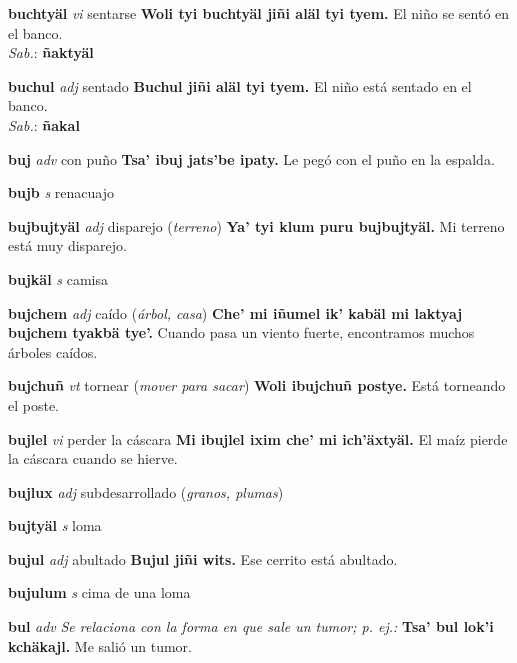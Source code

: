 \documentclass[10pt]{scrbook}
\newcommand{\entry}[1]{\textbf{#1}}
\newcommand{\nontranslationdef}[1]{\textit{#1}}
\newcommand{\partofspeech}[1]{\textit{#1}}
\newcommand{\spanishtranslation}[1]{#1}
\newcommand{\clarification}[1]{(\textit{#1})}
\newcommand{\cholexample}[1]{\textbf{#1}}
\newcommand{\exampletranslation}[1]{#1}
\newcommand{\dialectvariant}[1]{\\\textit{#1}:}
\newcommand{\dialectword}[1]{\textbf{#1}}
\begin{document}
\begin{multicols}{2}
\entry{buchtyäl}
\partofspeech{vi}
\spanishtranslation{sentarse}
\cholexample{Woli tyi buchtyäl jiñi aläl tyi tyem.}
\exampletranslation{El niño se sentó en el banco.}
\dialectvariant{Sab.}
\dialectword{ñaktyäl}

\entry{buchul}
\partofspeech{adj}
\spanishtranslation{sentado}
\cholexample{Buchul jiñi aläl tyi tyem.}
\exampletranslation{El niño está sentado en el banco.}
\dialectvariant{Sab.}
\dialectword{ñakal}

\entry{buj}
\partofspeech{adv}
\spanishtranslation{con puño}
\cholexample{Tsa' ibuj jats'be ipaty.}
\exampletranslation{Le pegó con el puño en la espalda.}

\entry{bujb}
\partofspeech{s}
\spanishtranslation{renacuajo}

\entry{bujbujtyäl}
\partofspeech{adj}
\spanishtranslation{disparejo}
\clarification{terreno}
\cholexample{Ya' tyi klum puru bujbujtyäl.}
\exampletranslation{Mi terreno está muy disparejo.}

\entry{bujkäl}
\partofspeech{s}
\spanishtranslation{camisa}

\entry{bujchem}
\partofspeech{adj}
\spanishtranslation{caído}
\clarification{árbol, casa}
\cholexample{Che' mi iñumel ik' kabäl mi laktyaj bujchem tyakbä tye'.}
\exampletranslation{Cuando pasa un viento fuerte, encontramos muchos árboles caídos.}

\entry{bujchuñ}
\partofspeech{vt}
\spanishtranslation{tornear}
\clarification{mover para sacar}
\cholexample{Woli ibujchuñ postye.}
\exampletranslation{Está torneando el poste.}

\entry{bujlel}
\partofspeech{vi}
\spanishtranslation{perder la cáscara}
\cholexample{Mi ibujlel ixim che' mi ich'äxtyäl.}
\exampletranslation{El maíz pierde la cáscara cuando se hierve.}

\entry{bujlux}
\partofspeech{adj}
\spanishtranslation{subdesarrollado}
\clarification{granos, plumas}

\entry{bujtyäl}
\partofspeech{s}
\spanishtranslation{loma}

\entry{bujul}
\partofspeech{adj}
\spanishtranslation{abultado}
\cholexample{Bujul jiñi wits.}
\exampletranslation{Ese cerrito está abultado.}

\entry{bujulum}
\partofspeech{s}
\spanishtranslation{cima de una loma}

\entry{bul}
\partofspeech{adv}
\nontranslationdef{Se relaciona con la forma en que sale un tumor; p. ej.:}
\cholexample{Tsa' bul lok'i kchäkajl.}
\exampletranslation{Me salió un tumor.}


\end{multicols}
\end{document}
